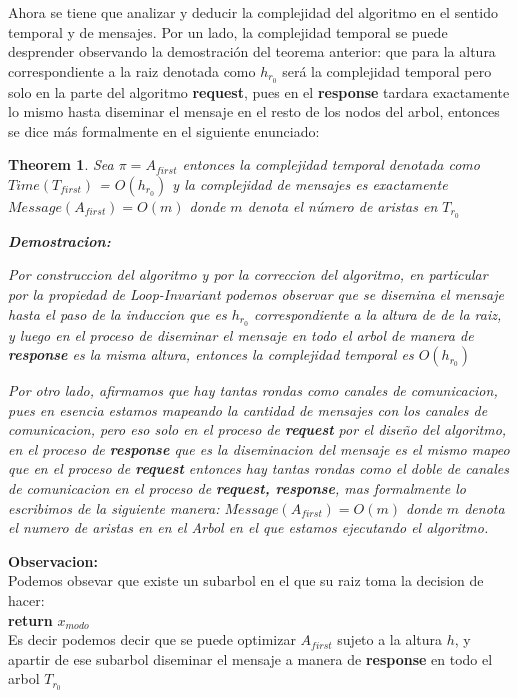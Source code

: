 \documentclass[11pt]{article}
\newtheorem{theorem}{Theorem}
\begin{document}
    Ahora se tiene que analizar y deducir la complejidad del algoritmo en el sentido temporal y de mensajes.
    Por un lado, la complejidad temporal se puede desprender observando la demostración del teorema anterior: \newline
    que para la altura correspondiente a la raiz denotada como $h_ {r_{0}}$ será la complejidad temporal pero solo en
    la parte del algoritmo \textbf{request}, pues en el \textbf{response} tardara exactamente lo mismo hasta diseminar
    el mensaje en el resto de los nodos del arbol, entonces se dice más formalmente en el siguiente enunciado:

\begin{theorem}
    Sea $\pi = A_{first}$ entonces la complejidad temporal denotada como $Time(T_{first})$ = $O(h_{r_{0}})$
    y la complejidad de mensajes es exactamente $Message(A_{first}) = O(m)$ donde $m$ denota el número de aristas
    en $T_{r_{0}}$


   \textbf{Demostracion:}
\begin{flushleft}
    Por construccion del algoritmo y por la correccion del algoritmo, en particular por la propiedad de Loop-Invariant
    podemos observar que se disemina el mensaje hasta el paso de la induccion que es $h_{r_{0}}$ correspondiente a la altura de
    de la raiz, y luego en el proceso de diseminar el mensaje en todo el arbol de manera de \textbf{response}
    es la misma altura, entonces la complejidad temporal es $O(h_{r_{0}})$

    Por otro lado, afirmamos que hay tantas rondas como canales de comunicacion, pues en esencia estamos mapeando
    la cantidad de mensajes con los canales de comunicacion, pero eso solo en el proceso de \textbf{request} por el diseño del
    algoritmo, en el proceso de \textbf{response} que es la diseminacion del mensaje es el mismo mapeo que en el proceso
    de \textbf{request} entonces hay tantas rondas como el doble de canales de comunicacion en el proceso de \textbf{request, response},
    mas formalmente lo escribimos de la siguiente manera:
    $Message(A_{first}) = O(m)$ donde $m$ denota el numero de aristas en en el Arbol en el que estamos ejecutando el algoritmo.

\end{flushleft}
\end{theorem}

    \textbf{Observacion:}\\
    Podemos obsevar que existe un subarbol en el que su raiz toma la decision de hacer:\\
    \textbf{return} $x_{modo}$\\
    Es decir podemos decir que se puede optimizar $A_{first}$ sujeto a la altura $h$, y apartir de ese subarbol diseminar
    el mensaje a manera de \textbf{response} en todo el arbol $T_{r_{0}}$
\end{document}
